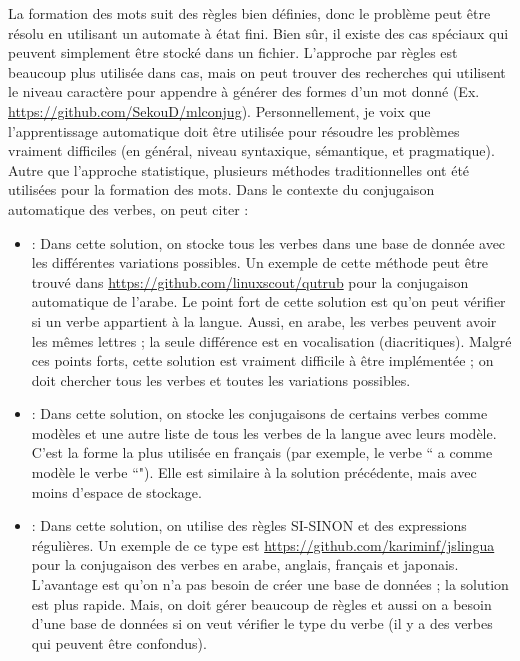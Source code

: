 \documentclass{KodeBook}
\begin{document}
La formation des mots suit des règles bien définies, donc le problème peut être résolu en utilisant un automate à état fini. 
Bien sûr, il existe des cas spéciaux qui peuvent simplement être stocké dans un fichier. 
L'approche par règles est beaucoup plus utilisée dans cas, mais on peut trouver des recherches qui utilisent le niveau caractère pour appendre à générer des formes d'un mot donné (Ex. \url{https://github.com/SekouD/mlconjug}). 
Personnellement, je voix que l'apprentissage automatique doit être utilisée pour résoudre les problèmes vraiment difficiles (en général, niveau syntaxique, sémantique, et pragmatique). 
Autre que l'approche statistique, plusieurs méthodes traditionnelles ont été utilisées pour la formation des mots. 
Dans le contexte du conjugaison automatique des verbes, on peut citer :
\begin{itemize}
	\item {} : Dans cette solution, on stocke tous les verbes dans une base de donnée avec les différentes variations possibles. 
	Un exemple de cette méthode peut être trouvé dans \url{https://github.com/linuxscout/qutrub} pour la conjugaison automatique de l'arabe. 
	Le point fort de cette solution est qu'on peut vérifier si un verbe appartient à la langue. 
	Aussi, en arabe, les verbes peuvent avoir les mêmes lettres ; la seule différence est en vocalisation (diacritiques).
	Malgré ces points forts, cette solution est vraiment difficile à être implémentée ; on doit chercher tous les verbes et toutes les variations possibles. 
	
	\item {} : Dans cette solution, on stocke les conjugaisons de certains verbes comme modèles et une autre liste de tous les verbes de la langue avec leurs modèle.
	C'est la forme la plus utilisée en français (par exemple, le verbe `` a comme modèle le verbe ``"). 
	Elle est similaire à la solution précédente, mais avec moins d'espace de stockage.
	
	\item {} : Dans cette solution, on utilise des règles SI-SINON et des expressions régulières. 
	Un exemple de ce type est \url{https://github.com/kariminf/jslingua} pour la conjugaison des verbes en arabe, anglais, français et japonais. 
	L'avantage est qu'on n'a pas besoin de créer une base de données ; la solution est plus rapide. 
	Mais, on doit gérer beaucoup de règles et aussi on a besoin d'une base de données si on veut vérifier le type du verbe (il y a des verbes qui peuvent être confondus).

\end{itemize}
\end{document}
